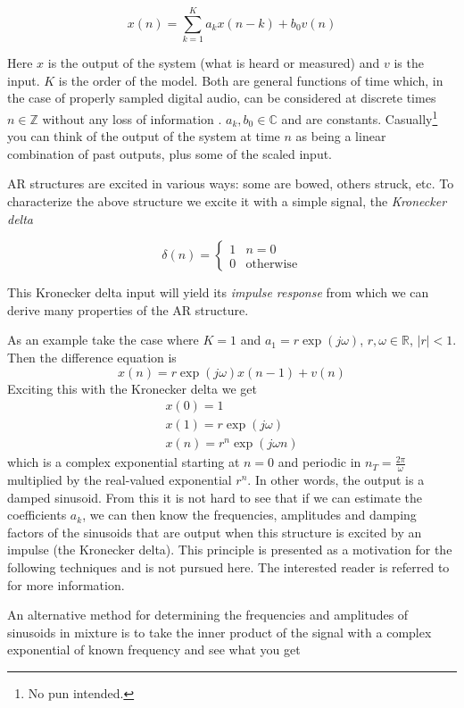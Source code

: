 \[
    x(n) = \sum_{k=1}^{K} a_k x(n-k) + b_0 v(n)
\]

Here $x$ is the output of the system (what is heard or measured) and $v$ is the
input. $K$ is the order of the model. Both are general functions of time which,
in the case of properly sampled digital audio, can be considered at discrete
times $n \in \mathbb{Z}$ without any loss of information
\cite[ch.~2]{crochiere1983multi}.  $a_k,b_0 \in \mathbb{C}$ and are constants.
Casually\footnote{No pun intended.} you can think of the output of the system at
time $n$ as being a linear combination of past outputs, plus some of the scaled
input.

AR structures are excited in various ways: some are bowed, others struck, etc.
To characterize the above structure we excite it with a simple signal, the
\textit{Kronecker delta}

\[
    \delta(n) = \begin{cases}
        1 & n=0\\
        0 & \text{otherwise}
    \end{cases}
\]

This Kronecker delta input will yield its \textit{impulse
response} from which we can derive many properties of the AR structure.

As an example take the case where $K=1$ and $a_1 = r \exp(j\omega)$, 
$r, \omega \in \mathbb{R}$, $|r|<1$. Then the difference equation is
\[
    x(n) = r \exp(j\omega) x(n-1) + v(n)
\]
Exciting this with the Kronecker delta we get
\[
    \begin{array}{c}
        x(0) = 1 \\
        x(1) = r \exp(j\omega) \\
        x(n) = r^n \exp(j\omega n)
    \end{array}
\]
which is a complex exponential starting at $n=0$ and periodic in
$n_T=\frac{2\pi}{\omega}$ multiplied by the real-valued
exponential $r^n$. In other words, the output is a damped sinusoid. From this
it is not hard to see that if we can estimate the coefficients $a_k$, we can
then know the frequencies, amplitudes and damping factors of the sinusoids that
are output when this structure is excited by an impulse (the Kronecker delta).
This principle is presented as a motivation for the following techniques and is
not pursued here. The interested reader is referred to \cite{makhoul1975linear}
for more information.

An alternative method for determining the frequencies and amplitudes of
sinusoids in mixture is to take the inner product of the signal with a complex
exponential of known frequency and see what you get

